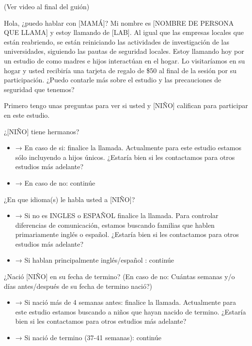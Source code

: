 \documentclass[
  12pt,
]{book}
\providecommand{\tightlist}{%
  \setlength{\itemsep}{0pt}\setlength{\parskip}{0pt}}
\begin{document}
(Ver video al final del guión)

Hola, ¿puedo hablar con {[}MAMÁ{]}?
Mi nombre es {[}NOMBRE DE PERSONA QUE LLAMA{]} y estoy llamando de {[}LAB{]}. Al igual que las empresas locales que están reabriendo, se están reiniciando las actividades de investigación de las universidades, siguiendo las pautas de seguridad locales. Estoy llamando hoy por un estudio de como madres e hijos interactúan en el hogar. Lo visitaríamos en su hogar y usted recibiría una tarjeta de regalo de \$50 al final de la sesión por su participación. ¿Puedo contarle más sobre el estudio y las precauciones de seguridad que tenemos?

Primero tengo unas preguntas para ver si usted y {[}NIÑO{]} califican para participar en este estudio.

¿{[}NIÑO{]} tiene hermanos?

\begin{itemize}
\tightlist
\item
  → En caso de si: finalice la llamada. Actualmente para este estudio estamos sólo incluyendo a hijos únicos. ¿Estaría bien si les contactamos para otros estudios más adelante?
\item
  → En caso de no: continúe
\end{itemize}

¿En que idioma(s) le habla usted a {[}NIÑO{]}?

\begin{itemize}
\tightlist
\item
  → Si no es INGLES o ESPAÑOL finalice la llamada. Para controlar diferencias de comunicación, estamos buscando familias que hablen primariamente inglés o español. ¿Estaría bien si les contactamos para otros estudios más adelante?
\item
  → Si hablan principalmente inglés/español : continúe
\end{itemize}

¿Nació {[}NIÑO{]} en su fecha de termino? (En caso de no: Cuántas semanas y/o días antes/después de su fecha de termino nació?)

\begin{itemize}
\tightlist
\item
  → Si nació más de 4 semanas antes: finalice la llamada. Actualmente para este estudio estamos buscando a niños que hayan nacido de termino. ¿Estaría bien si les contactamos para otros estudios más adelante?
\item
  → Si nació de termino (37-41 semanas): continúe
\end{itemize}
\end{document}

